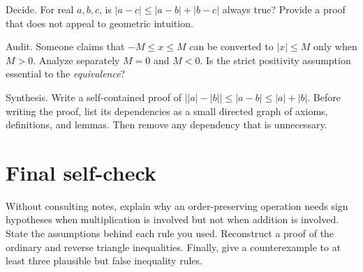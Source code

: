 \documentclass{workbook}
\begin{document}
\begin{problem}{Decide.}
For real $a,b,c$, is
$|a-c|\leq |a-b|+|b-c|$ always true?
Provide a proof that does not appeal to geometric intuition.
\end{problem}

\begin{problem}{Audit.}
Someone claims that $-M\leq x\leq M$ can be converted to
$|x|\leq M$ only when $M>0$. Analyze separately $M=0$ and $M<0$.
Is the strict positivity assumption essential to the \emph{equivalence}?
\end{problem}

\begin{problem}{Synthesis.}
Write a self-contained proof of
$\bigl||a|-|b|\bigr|\leq|a-b|\leq|a|+|b|$.
Before writing the proof, list its dependencies as a small directed
graph of axioms, definitions, and lemmas. Then remove any dependency
that is unnecessary.
\end{problem}

\section*{Final self-check}

Without consulting notes, explain why an order-preserving operation needs
sign hypotheses when multiplication is involved but not when addition is
involved. State the assumptions behind each rule you used. Reconstruct a
proof of the ordinary and reverse triangle inequalities. Finally, give a
counterexample to at least three plausible but false inequality rules.
\end{document}
